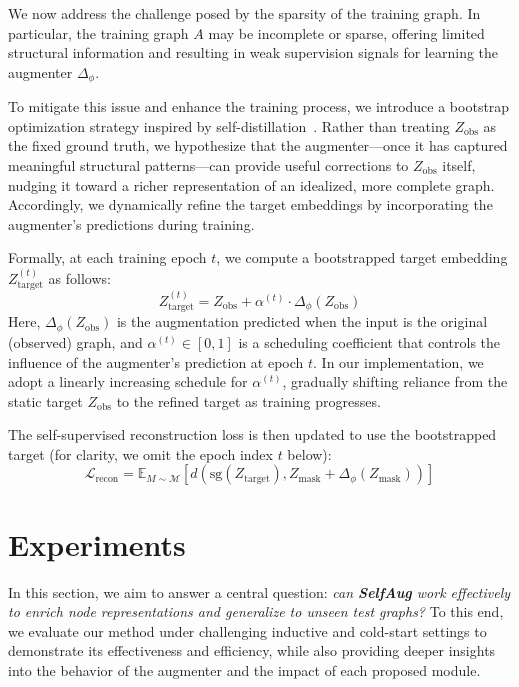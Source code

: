 \documentclass[letterpaper]{article} \usepackage{aaai2026}  \usepackage{times}  \usepackage{helvet}  \usepackage{courier}  \usepackage[hyphens]{url}  \usepackage{graphicx} \urlstyle{rm} \def\UrlFont{\rm}  \usepackage{natbib}  \usepackage{caption} \frenchspacing  \setlength{\pdfpagewidth}{8.5in}  \setlength{\pdfpageheight}{11in}
\begin{document}
We now address the challenge posed by the sparsity of the training graph. In particular, the training graph \( A \) may be incomplete or sparse, offering limited structural information and resulting in weak supervision signals for learning the augmenter \( \Delta_{\phi} \).

To mitigate this issue and enhance the training process, we introduce a bootstrap optimization strategy inspired by self-distillation~\cite{zhang2019your}. Rather than treating \( Z_{\text{obs}} \) as the fixed ground truth, we hypothesize that the augmenter—once it has captured meaningful structural patterns—can provide useful corrections to \( Z_{\text{obs}} \) itself, nudging it toward a richer representation of an idealized, more complete graph. Accordingly, we dynamically refine the target embeddings by incorporating the augmenter's predictions during training.

Formally, at each training epoch \( t \), we compute a bootstrapped target embedding \( Z_{\text{target}}^{(t)} \) as follows:
\begin{equation}
Z_{\text{target}}^{(t)} = Z_{\text{obs}} + \alpha^{(t)} \cdot \Delta_{\phi}(Z_{\text{obs}})
\label{eq:bootstrap_target}
\end{equation}
Here, \( \Delta_{\phi}(Z_{\text{obs}}) \) is the augmentation predicted when the input is the original (observed) graph, and \( \alpha^{(t)} \in [0,1] \) is a scheduling coefficient that controls the influence of the augmenter's prediction at epoch \( t \). In our implementation, we adopt a linearly increasing schedule for \( \alpha^{(t)} \), gradually shifting reliance from the static target \( Z_{\text{obs}} \) to the refined target as training progresses.

The self-supervised reconstruction loss is then updated to use the bootstrapped target (for clarity, we omit the epoch index \( t \) below):
\begin{equation}
\label{eq:loss_3}
\mathcal{L}_{\text{recon}} = \mathbb{E}_{M \sim \mathcal{M}} \left[ d(\text{sg}(Z_{\text{target}}), Z_{\text{mask}} + \Delta_{\phi}(Z_{\text{mask}})) \right]
\end{equation}

\section{Experiments}

In this section, we aim to answer a central question:
\textit{can \textbf{SelfAug} work effectively to enrich node representations and generalize to unseen test graphs?} To this end, we evaluate our method under challenging inductive and cold-start settings to demonstrate its effectiveness and efficiency, while also providing deeper insights into the behavior of the augmenter and the impact of each proposed module.
\end{document}
